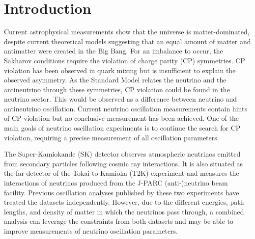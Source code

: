 \chapter{Introduction}
\label{chap:Introduction}

Current astrophysical measurements show that the universe is matter-dominated, despite current theoretical models suggesting that an equal amount of matter and antimatter were created in the Big Bang.
For an imbalance to occur, the Sakharov conditions \cite{Sakharov1991} require the violation of charge parity (CP) symmetries.
CP violation has been observed in quark mixing but is insufficient to explain the observed asymmetry.
As the Standard Model relates the neutrino and the antineutrino through these symmetries, CP violation could be found in the neutrino sector.
This would be observed as a difference between neutrino and antineutrino oscillation.
Current neutrino oscillation measurements contain hints of CP violation \cite{Dunne2020-uf} but no conclusive measurement has been achieved.
One of the main goals of neutrino oscillation experiments is to continue the search for CP violation, requiring a precise measurement of all oscillation parameters.

The Super-Kamiokande (SK) detector observes atmospheric neutrinos emitted from secondary particles following cosmic ray interactions. It is also situated as the far detector of the Tokai-to-Kamioka (T2K) experiment and measures the interactions of neutrinos produced from the J-PARC (anti-)neutrino beam facility. Previous oscillation analyses published by these two experiments have treated the datasets independently. However, due to the different energies, path lengths, and density of matter in which the neutrinos pass through, a combined analysis can leverage the constraints from both datasets and may be able to improve measurements of neutrino oscillation parameters.

